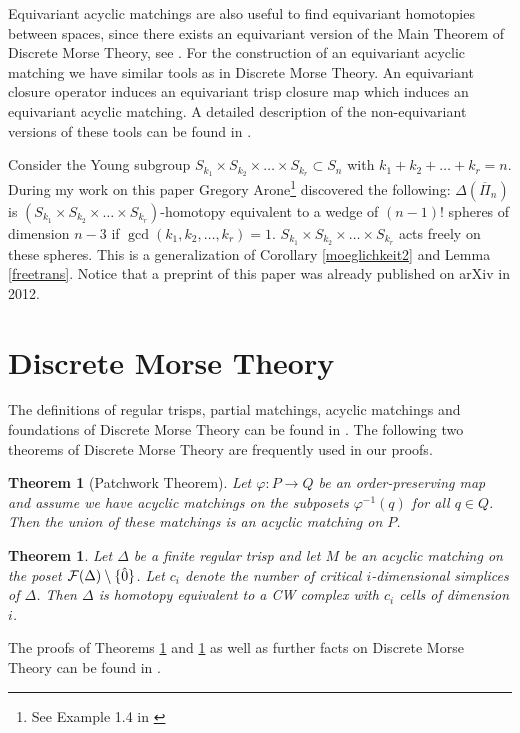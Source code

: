 \documentclass{elsarticle}
\newtheorem{thm}[df]{Theorem}
\begin{document}
Equivariant acyclic matchings are also useful to find equivariant homotopies between spaces, since there exists an equivariant version of the Main Theorem of Discrete Morse Theory, see \cite{freij}. For the construction of an equivariant acyclic matching we have similar tools as in Discrete Morse Theory. An equivariant closure operator induces an equivariant trisp closure map which induces an equivariant acyclic matching. A detailed description of the non-equivariant versions of these tools can be found in \cite{clmap}.

Consider the Young subgroup $S_{k_1}\times S_{k_2}\times\dots\times S_{k_r}\subset S_n$ with $k_1+k_2+\dots+k_r=n$. During my work on this paper Gregory Arone\footnote{See Example 1.4 in \cite{arone}} discovered the following: $\Delta(\overline{\Pi}_n)$ is $(S_{k_1}\times S_{k_2}\times\dots\times S_{k_r})$-homotopy equivalent to a wedge of $(n-1)!$ spheres of dimension $n-3$ if $\gcd(k_1,k_2,\dots,k_r)=1$. $S_{k_1}\times S_{k_2}\times\dots\times S_{k_r}$ acts freely on these spheres. This is a generalization of Corollary \ref{moeglichkeit2} and Lemma \ref{freetrans}. Notice that a preprint of this paper was already published on arXiv in 2012.
\section{Discrete Morse Theory}
The definitions of regular trisps, partial matchings, acyclic matchings and foundations of Discrete Morse Theory can be found in \cite{forman,clmap,buch}. The following two theorems of Discrete Morse Theory are frequently used in our proofs.
\begin{thm}[Patchwork Theorem]
\label{patchwork}
Let $\varphi:P\longrightarrow Q$ be an order-preserving map and assume we have acyclic matchings on the subposets $\varphi^{-1}(q)$ for all $q\in Q$. Then the union of these matchings is an acyclic matching on $P$.
\end{thm}
\begin{thm}%
\label{morsemain}
Let $\Delta$ be a finite regular trisp and let $M$ be an acyclic matching on the poset ${\cal F}(\Delta)\setminus\{\hat{0}\}$. Let $c_i$ denote the number of critical $i$-dimensional simplices of $\Delta$. Then $\Delta$ is homotopy equivalent to a CW complex with $c_i$ cells of dimension $i$.
\end{thm}
The proofs of Theorems \ref{patchwork} and \ref{morsemain} as well as further facts on Discrete Morse Theory can be found in \cite[Chapter 11]{buch}.
\end{document}

